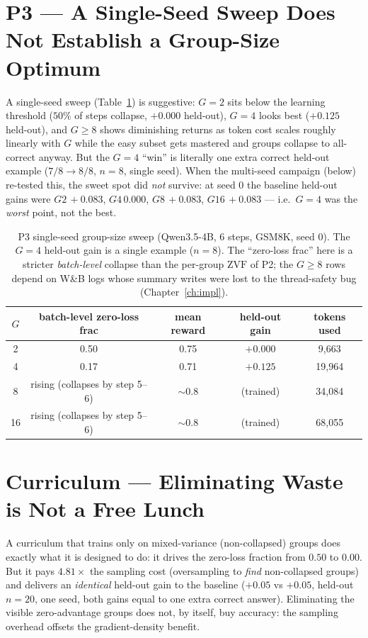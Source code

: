 \documentclass[12pt,a4paper]{report}
\newcommand{\zvf}{\mathrm{ZVF}}
\begin{document}
\section{P3 --- A Single-Seed Sweep Does Not Establish a Group-Size Optimum}
\label{sec:p3}

A single-seed sweep (Table~\ref{tab:p3}) is suggestive: $G{=}2$ sits below the
learning threshold ($50\%$ of steps collapse, $+0.000$ held-out), $G{=}4$ looks best
($+0.125$ held-out), and $G\ge8$ shows diminishing returns as token cost scales
roughly linearly with $G$ while the easy subset gets mastered and groups collapse to
all-correct anyway. But the $G{=}4$ ``win'' is literally one extra correct held-out
example ($7/8 \to 8/8$, $n=8$, single seed). When the multi-seed campaign (below)
re-tested this, the sweet spot did \emph{not} survive: at seed 0 the baseline
held-out gains were $G2\,{+}0.083$, $G4\,{0.000}$, $G8\,{+}0.083$, $G16\,{+}0.083$
--- i.e.\ $G{=}4$ was the \emph{worst} point, not the best.

\begin{table}[t]
\centering
\small
\begin{tabular}{@{}ccccc@{}}
\toprule
$G$ & batch-level zero-loss frac & mean reward & held-out gain & tokens used \\
\midrule
2  & 0.50 & 0.75 & $+0.000$ & 9{,}663 \\
4  & 0.17 & 0.71 & $+0.125$ & 19{,}964 \\
8  & rising (collapses by step 5--6) & ${\sim}0.8$ & (trained) & 34{,}084 \\
16 & rising (collapses by step 5--6) & ${\sim}0.8$ & (trained) & 68{,}055 \\
\bottomrule
\end{tabular}
\caption{P3 single-seed group-size sweep (Qwen3.5-4B, 6 steps, GSM8K, seed 0). The
$G{=}4$ held-out gain is a single example ($n=8$). The ``zero-loss frac'' here is a
stricter \emph{batch-level} collapse than the per-group $\zvf$ of P2; the $G\ge8$
rows depend on W\&B logs whose summary writes were lost to the thread-safety bug
(Chapter~\ref{ch:impl}).}
\label{tab:p3}
\end{table}

\section{Curriculum --- Eliminating Waste is Not a Free Lunch}
A curriculum that trains only on mixed-variance (non-collapsed) groups does exactly
what it is designed to do: it drives the zero-loss fraction from $0.50$ to $0.00$.
But it pays $4.81\times$ the sampling cost (oversampling to \emph{find} non-collapsed
groups) and delivers an \emph{identical} held-out gain to the baseline ($+0.05$ vs
$+0.05$, held-out $n=20$, one seed, both gains equal to one extra correct answer).
Eliminating the visible zero-advantage groups does not, by itself, buy accuracy: the
sampling overhead offsets the gradient-density benefit.
\end{document}
